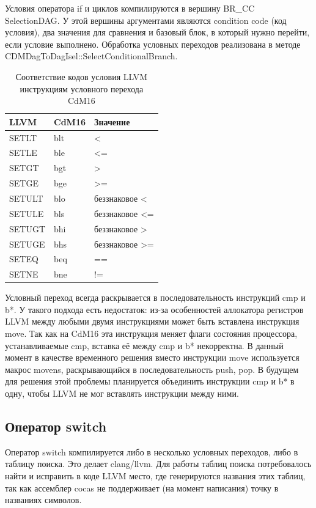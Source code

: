 \documentclass[a4paper,14pt]{extarticle}
\begin{document}
Условия оператора if и циклов компилируются в вершину BR\_CC\\SelectionDAG. У этой вершины аргументами являются condition code (код условия), два значения для сравнения и базовый блок, в который нужно перейти, если условие выполнено. Обработка условных переходов реализована в методе CDMDagToDagIsel::SelectConditionalBranch.
\begin{table}[!h]
	\begin{center}
		\begin{tabular}{ |l|l|l|  }
			\hline
			LLVM & CdM16 & Значение \\
			\hline
			SETLT & blt & < \\
			SETLE & ble & <= \\
			SETGT & bgt & > \\
			SETGE & bge & >= \\
			SETULT & blo & беззнаковое < \\
			SETULE & bls & беззнаковое <= \\
			SETUGT & bhi & беззнаковое > \\
			SETUGE & bhs & беззнаковое >= \\
			SETEQ & beq & ==\\
			SETNE & bne & != \\

			\hline
		\end{tabular}
		\caption{Соответствие кодов условия LLVM инструкциям условного перехода CdM16}
	\end{center}
\end{table}
Условный переход всегда раскрывается в последовательность инструкций cmp и b*. У такого подхода есть недостаток: из-за особенностей аллокатора регистров LLVM между любыми двумя инструкциями может быть вставлена инструкция move. Так как на CdM16 эта инструкция меняет флаги состояния процессора, устанавливаемые cmp, вставка её между cmp и b* некорректна. В данный момент в качестве временного решения вместо инструкции move используется макрос movens, раскрывающийся в последовательность push, pop. В будущем для решения этой проблемы планируется объединить инструкции cmp и b* в одну, чтобы LLVM не мог вставлять инструкции между ними.

\subsection{Оператор switch}

Оператор switch компилируется либо в несколько условных переходов, либо в таблицу поиска. Это делает clang/llvm. Для работы таблиц поиска потребовалось найти и исправить в коде LLVM место, где генерируются названия этих таблиц, так как ассемблер cocas не поддерживает (на момент написания) точку в названиях символов.
\end{document}

